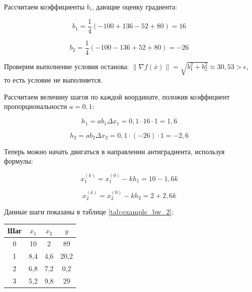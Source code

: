 \documentclass[a4paper,12pt]{report}
\begin{document}
Рассчитаем коэффициенты $b_{i}$, дающие оценку градиента: 

\begin{equation*}
b_{1} = \frac{1}{4}\left(-100+136-52+80\right) = 16
\end{equation*}

\begin{equation*}
b_{2} = \frac{1}{4}\left(-100-136+52+80\right) = -26
\end{equation*}

Проверим выполнение условия останова: $\left\|\nabla f(\overline{x})\right\| = \sqrt{b^{2}_{1} + b^{2}_{2}} \approx 30,53 > \epsilon$, то есть условие не выполняется.

Рассчитаем величину шагов по каждой координате, положив коэффициент пропорциональности $a = 0,1$: 

\begin{equation*}
h_{1} = ab_{1}\Delta x_{1} = 0,1\cdot16\cdot1 = 1,6
\end{equation*}

\begin{equation*}
h_{2} = ab_{2}\Delta x_{2} = 0,1\cdot(-26)\cdot1 = -2,6
\end{equation*}

Теперь можно начать двигаться в направлении антиградиента, используя формулы: 

\begin{equation*}
x^{(k)}_{1} = x^{(0)}_{1} - kh_{1} = 10 - 1,6k
\end{equation*}

\begin{equation*}
x^{(k)}_{2} = x^{(0)}_{2} - kh_{2} = 2+2,6k
\end{equation*}

Данные шаги показаны в таблице \ref{tab:example_bw_2}:

\begin{center}
  \captionsetup{justification=raggedleft}
  \label{tab:example_bw_2}
  \begin{tabular}{|c|c|c|c|}
    \hline
    Шаг & $x_{1}$ & $x_{2}$ & $y$\\
    \hline
    0 & 10 & 2 & 89\\
    \hline
    1 & 8,4 & 4,6 & 20,2\\
    \hline
    2 & 6,8 & 7,2 & 0,2\\
    \hline
    3 & 5,2 & 9,8 & 29\\
    \hline
  \end{tabular}
\end{center}
\end{document}
